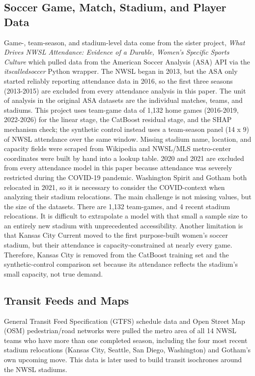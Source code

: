 \documentclass[9pt,twoside]{pnas-new}
\begin{document}
\subsection{Soccer Game, Match, Stadium, and Player Data} Game-, team-season, and stadium-level data come from the sister project, \textit{What Drives NWSL Attendance: Evidence of a Durable, Women’s Specific Sports Culture} which pulled data from the American Soccer Analysis (ASA) API via the \textit{itscalledsoccer} Python wrapper. The NWSL began in 2013, but the ASA only started reliably reporting attendance data in 2016, so the first three seasons (2013-2015) are excluded from every attendance analysis in this paper. The unit of analysis in the original ASA datasets are the individual matches, teams, and stadiums. This project uses team-game data of 1,132 home games (2016-2019, 2022-2026) for the linear stage, the CatBoost residual stage, and the SHAP mechanism check; the synthetic control instead uses a team-season panel (14 x 9) of NWSL attendance over the same window. Missing stadium name, location, and capacity fields were scraped from Wikipedia and NWSL/MLS metro-center coordinates were built by hand into a lookup table. 2020 and 2021 are excluded from every attendance model in this paper because attendance was severely restricted during the COVID-19 pandemic. Washington Spirit and Gotham both relocated in 2021, so it is necessary to consider the COVID-context when analyzing their stadium relocations. The main challenge is not missing values, but the size of the datasets. There are 1,132 team-games, and 4 recent stadium relocations. It is difficult to extrapolate a model with that small a sample size to an entirely new stadium with unprecedented accessibility. Another limitation is that Kansas City Current moved to the first purpose-built women's soccer stadium, but their attendance is capacity-constrained at nearly every game. Therefore, Kansas City is removed from the CatBoost training set and the synthetic-control comparison set because its attendance reflects the stadium's small capacity, not true demand. 

\subsection{Transit Feeds and Maps} General Transit Feed Specification (GTFS) schedule data and Open Street Map (OSM) pedestrian/road networks were pulled the metro area of all 14 NWSL teams who have more than one completed season, including the four most recent stadium relocations (Kansas City, Seattle, San Diego, Washington) and Gotham's own upcoming move. This data is later used to build transit isochrones around the NWSL stadiums.
\end{document}
